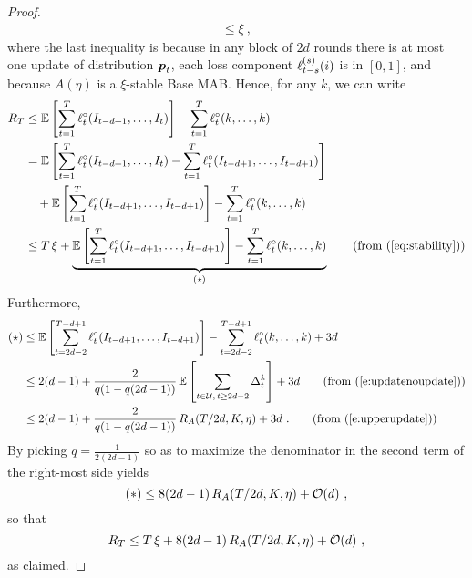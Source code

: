 \begin{proof}
\begin{align}
\le
    \xi~,
\end{align}
%
where the last inequality is because in any block of $2d$ rounds there is
at most one update of distribution $\boldsymbol{p}_t$, each loss component $\ell_{t-s}^{(s)}(i)$ is in $[0,1]$, and because $A(\eta)$ is a $\xi$-stable
Base MAB.
Hence, for any $k$, we can write
\begin{align*}
    R_T
&\le
    \E\left[\sum_{t=1}^T \lcomp_t(I_{t-d+1},\dots,I_t)\right] - \sum_{t=1}^T \lcomp_t(k,\dots,k)
\\&=
    \E\left[\sum_{t=1}^T \lcomp_t(I_{t-d+1},\dots,I_t) - \sum_{t=1}^T \lcomp_t(I_{t-d+1},\dots,I_{t-d+1})\right]
\\&
    \quad + \E\left[\sum_{t=1}^T \lcomp_t(I_{t-d+1},\dots,I_{t-d+1})\right] - \sum_{t=1}^T \lcomp_t(k,\dots,k)
\\&\le
    T\,\xi + \underbrace{\E\left[\sum_{t=1}^T \lcomp_t(I_{t-d+1},\dots,I_{t-d+1})\right] - \sum_{t=1}^T \lcomp_t(k,\dots,k)}_{(\star)}
    \tag{from~(\ref{eq:stability})}
\end{align*}
%
Furthermore,
%
\begin{align*}
    (\star)
&\leq
    \E\left[\sum_{t=2d-2}^{T-d+1} \lcomp_t(I_{t-d+1},\dots,I_{t-d+1})\right] - \sum_{t=2d-2}^{T-d+1} \lcomp_t(k,\dots,k) + 3d
\\&\leq
    2(d-1) + \frac{2}{q(1-q(2d-1))}\,\E\left[\sum_{t\in \scU,\,t\geq 2d-2} \Delta_t^k \right] + 3d
\tag{from~(\ref{e:updatenoupdate})}
\\&\leq
    2(d-1) + \frac{2}{q(1-q(2d-1))}\,R_A(T/2d,K,\eta) + 3d~.
\tag{from~(\ref{e:upperupdate})}
\end{align*}
%
By picking $q = \tfrac{1}{2(2d-1)}$ so as to maximize the denominator in the second term of the right-most side yields
\[
(*) \leq 8(2d-1)\,R_A(T/2d,K,\eta) + \mathcal{O}(d)~,
\]
so that
\[
R_T \leq T\,\xi + 8(2d-1)\,R_A(T/2d,K,\eta) + \mathcal{O}(d)~,
\]
as claimed.
\end{proof}




